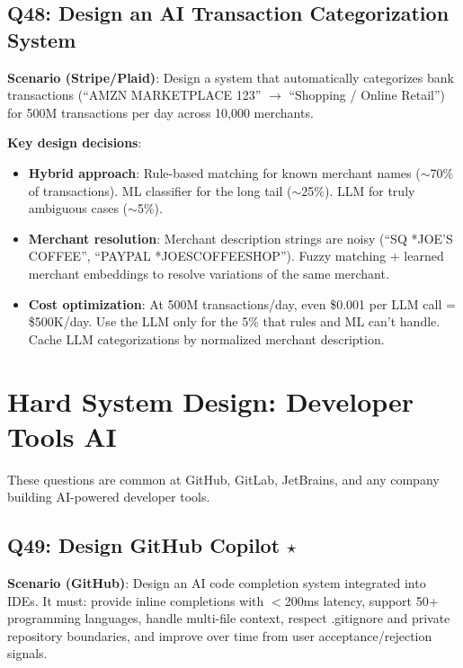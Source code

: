 \subsection{Q48: Design an AI Transaction Categorization System}

\textbf{Scenario (Stripe/Plaid)}: Design a system that automatically categorizes bank transactions (``AMZN MARKETPLACE 123'' $\to$ ``Shopping / Online Retail'') for 500M transactions per day across 10,000 merchants.

\textbf{Key design decisions}:
\begin{itemize}[leftmargin=*]
    \item \textbf{Hybrid approach}: Rule-based matching for known merchant names ($\sim$70\% of transactions). ML classifier for the long tail ($\sim$25\%). LLM for truly ambiguous cases ($\sim$5\%).
    \item \textbf{Merchant resolution}: Merchant description strings are noisy (``SQ *JOE'S COFFEE'', ``PAYPAL *JOESCOFFEESHOP''). Fuzzy matching + learned merchant embeddings to resolve variations of the same merchant.
    \item \textbf{Cost optimization}: At 500M transactions/day, even \$0.001 per LLM call = \$500K/day. Use the LLM only for the 5\% that rules and ML can't handle. Cache LLM categorizations by normalized merchant description.
\end{itemize}


\section{Hard System Design: Developer Tools AI}
\label{sec:hard-devtools}

These questions are common at GitHub, GitLab, JetBrains, and any company building AI-powered developer tools.

\subsection{Q49: Design GitHub Copilot $\star$}

\textbf{Scenario (GitHub)}: Design an AI code completion system integrated into IDEs. It must: provide inline completions with $<$200ms latency, support 50+ programming languages, handle multi-file context, respect .gitignore and private repository boundaries, and improve over time from user acceptance/rejection signals.

